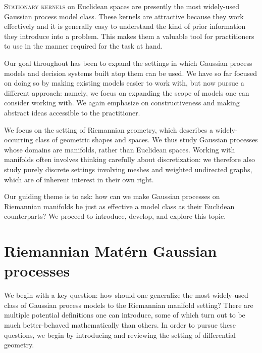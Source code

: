 \documentclass[11pt]{book}
\begin{document}
\lettrine{S}{tationary kernels} on Euclidean spaces are presently the most widely-used Gaussian process model class.
These kernels are attractive because they work effectively and it is generally easy to understand the kind of prior information they introduce into a problem.
This makes them a valuable tool for practitioners to use in the manner required for the task at hand.

Our goal throughout has been to expand the settings in which Gaussian process models and decision systems built atop them can be used.
We have so far focused on doing so by making existing models easier to work with, but now pursue a different approach: namely, we focus on expanding the scope of models one can consider working with.
We again emphasize on constructiveness and making abstract ideas accessible to the practitioner.

We focus on the setting of Riemannian geometry, which describes a widely-occurring class of geometric shapes and spaces.
We thus study Gaussian processes whose domains are manifolds, rather than Euclidean spaces.
Working with manifolds often involves thinking carefully about discretization: we therefore also study purely discrete settings involving meshes and weighted undirected graphs, which are of inherent interest in their own right.

Our guiding theme is to ask: how can we make Gaussian processes on Riemannian manifolds be just as effective a model class as their Euclidean counterparts?
We proceed to introduce, develop, and explore this topic.


\section{Riemannian Matérn Gaussian processes}

We begin with a key question: how should one generalize the most widely-used class of Gaussian process models to the Riemannian manifold setting?
There are multiple potential definitions one can introduce, some of which turn out to be much better-behaved mathematically than others.
In order to pursue these questions, we begin by introducing and reviewing the setting of differential geometry.
\end{document}
